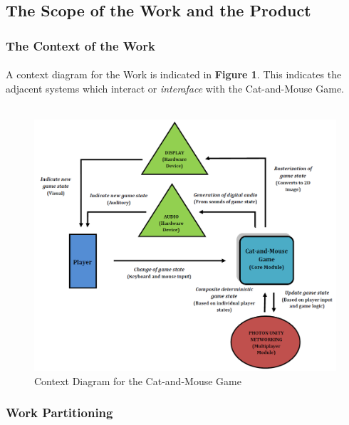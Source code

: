 \documentclass[12pt, titlepage]{article}
\begin{document}
\subsection{The Scope of the Work and the Product}
\newpage
\subsubsection{The Context of the Work}
\paragraph{}A context diagram for the Work is indicated in \textbf{Figure 1}. This indicates the adjacent systems which interact or \emph{interaface} with the Cat-and-Mouse Game.
\\
\\
\begin {figure}[h]
    \centering
\includegraphics[width=\textwidth]{ContextDiagram.png}
\caption{Context Diagram for the Cat-and-Mouse Game}
\end{figure}
\newpage
\subsubsection{Work Partitioning}
\end{document}
